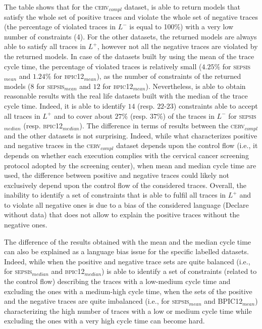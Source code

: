 The table shows that for the \textsc{cerv$_{compl}$} dataset, \nd is able to return models that satisfy the whole set of positive traces and violate the whole set of negative traces (the percentage of violated traces in $L^-$ is equal to 100\%) with a very low number of constraints (4). For the other datasets, the returned models are always able to satisfy all traces in $L^+$, however not all the negative traces are violated by the returned models. In case of the datasets built by using the mean of the trace cycle time, the percentage of violated traces is relatively small ($4.25\%$ for \textsc{sepsis$_{mean}$} and $1.24\%$ for \textsc{bpic12$_{mean}$}), as the number of constraints of the returned models ($8$ for \textsc{sepsis$_{mean}$} and $12$ for \textsc{bpic12$_{mean}$}). Nevertheless, \nd is able to obtain reasonable results with the real life datasets built with the median of the trace cycle time. Indeed, it is able to identify $14$ (resp. $22$-$23$) constraints able to accept all traces in $L^+$ and to cover about $27\%$ (resp. $37\%$) of the traces in $L^-$ for \textsc{sepsis$_{median}$} (resp. \textsc{bpic12$_{median}$}). The difference in terms of results between the \textsc{cerv$_{compl}$} and the other datasets is not surprising. Indeed, while what characterizes positive and negative traces in the \textsc{cerv$_{compl}$} dataset depends upon the control flow (i.e., it depends on whether each execution complies with the cervical cancer screening protocol adopted by the screening center), when mean and median cycle time are used, the difference between positive and negative traces could likely not exclusively depend upon the control flow of the considered traces. Overall, the inability to identify a set of constraints that is able to fulfil all traces  in $L^+$ and to violate all negative ones is due to a bias of the considered language (Declare without data) that does not allow to explain the positive traces without the negative ones.

The difference of the results obtained with the mean and the median cycle time can also be explained as a language bias issue for the specific labelled datasets. Indeed, while when the positive and negative trace sets are quite balanced (i.e., for \textsc{sepsis$_{median}$} and \textsc{bpic12$_{median}$}) \nd is able to identify a set of constraints (related to the control flow) describing the traces with a low-medium cycle time and excluding the ones with a medium-high cycle time, when the sets of the positive and the negative traces are quite imbalanced (i.e., for \textsc{sepsis$_{mean}$} and \textsc{BPIC12$_{mean}$})
 characterizing the high number of traces with a low or medium cycle time while excluding the ones with a very high cycle time can become hard. 

